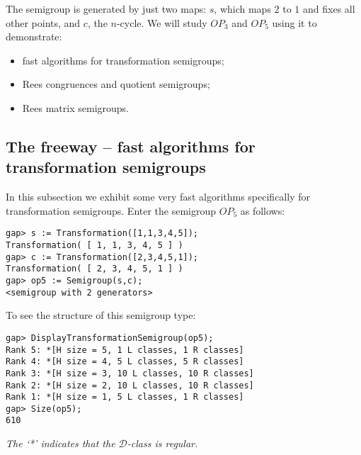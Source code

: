 \documentclass[12pt]{article}
\theoremstyle{plain} \newtheorem{Thm}{Theorem}
\theoremstyle{plain} \newtheorem{Cor}{Corollary}
\theoremstyle{plain} \newtheorem{Lemma}{Lemma}
\theoremstyle{plain} \newtheorem{Prop}{Proposition}
\theoremstyle{plain} \newtheorem{Ex}{Exercise}
\def\d{${\mathcal{D}}$}
\begin{document}
The semigroup is generated by just two maps: $s$, which maps 
$2$ to $1$ and fixes all other points,  and $c$, the $n$-cycle.
We will study $OP_3$ and $OP_5$ using it to demonstrate:
\begin{itemize}
\item fast algorithms for transformation semigroups;
\item Rees congruences and quotient semigroups;
\item Rees matrix semigroups.
\end{itemize}

\subsection{The freeway -- fast algorithms for transformation semigroups}
In this subsection we exhibit some very fast algorithms specifically
for transformation semigroups.  Enter the semigroup $OP_5$ as follows:

\begin{verbatim}
gap> s := Transformation([1,1,3,4,5]); 
Transformation( [ 1, 1, 3, 4, 5 ] )
gap> c := Transformation([2,3,4,5,1]);
Transformation( [ 2, 3, 4, 5, 1 ] )
gap> op5 := Semigroup(s,c);
<semigroup with 2 generators>
\end{verbatim}

To see the structure of this semigroup type:
\begin{verbatim}
gap> DisplayTransformationSemigroup(op5);
Rank 5: *[H size = 5, 1 L classes, 1 R classes]
Rank 4: *[H size = 4, 5 L classes, 5 R classes]
Rank 3: *[H size = 3, 10 L classes, 10 R classes]
Rank 2: *[H size = 2, 10 L classes, 10 R classes]
Rank 1: *[H size = 1, 5 L classes, 1 R classes]
gap> Size(op5);
610
\end{verbatim}
{\em The `*' indicates that the \d-class is regular.}
\end{document}
